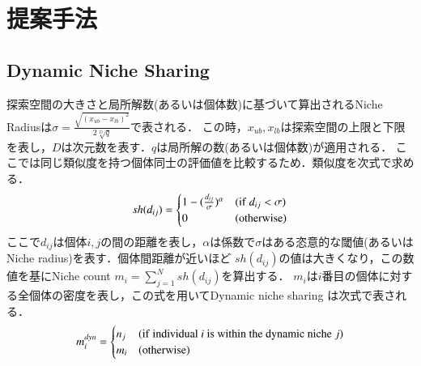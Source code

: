 \documentclass[twocolumn, a4paper]{UECIEresume}
\begin{document}
\section{提案手法}
\subsection{Dynamic Niche Sharing}
\label{ss:dns}
探索空間の大きさと局所解数(あるいは個体数)に基づいて算出されるNiche Radiusは$\sigma=\frac{\sqrt{(x_{ub}-x_{lb})^2}}{2 \sqrt[D]{q}}$で表される．
この時，$x_{ub},x_{lb}$は探索空間の上限と下限を表し，$D$は次元数を表す．$q$は局所解の数(あるいは個体数)が適用される．
ここでは同じ類似度を持つ個体同士の評価値を比較するため．類似度を次式で求める．
\begin{equation}
\label{eq:sfunc}
sh(d_{ij})= \begin{cases}
1-(\frac{d_{ij}}{\sigma})^\alpha & ({\rm if} \ d_{ij} < \sigma)\\
0 & ({\rm otherwise})
\end{cases}
\end{equation}
ここで$d_{ij}$は個体$i,j$の間の距離を表し，$\alpha$は係数で$\sigma$はある恣意的な閾値(あるいはNiche radius)を表す．個体間距離が近いほど $sh(d_{ij})$の値は大きくなり，この数値を基にNiche count $m_i=\sum_{j=1}^N sh(d_{ij})$を算出する．
$m_i$は$i$番目の個体に対する全個体の密度を表し，この式を用いてDynamic niche sharing \cite{DNS} は次式で表される．
\begin{equation}
\label{eq:dns}
m_i^{dyn}=\begin{cases}
n_j & ({\rm if \ individual}\ i {\rm \ is \ within \ the \ dynamic \ niche }\ j) \\
m_i & ({\rm otherwise})
\end{cases}
\end{equation}
\end{document}

